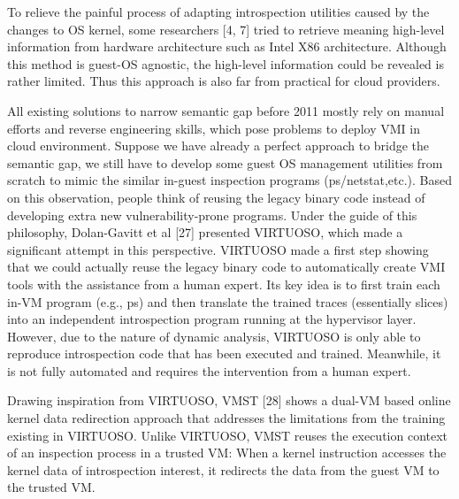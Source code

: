 To relieve the painful process of adapting introspection utilities caused by the changes to OS kernel, some researchers [4, 7] tried to retrieve meaning high-level information from hardware architecture such as Intel X86 architecture. Although this method is guest-OS agnostic, the high-level information could be revealed is rather limited. Thus this approach is also far from practical for cloud providers. 

All existing solutions to narrow semantic gap before 2011 mostly rely on manual efforts and reverse engineering skills, which pose problems to deploy VMI in cloud environment. Suppose we have already a perfect approach to bridge the semantic gap, we still have to develop some guest OS management utilities from scratch to mimic the similar in-guest inspection programs (ps/netstat,etc.). Based on this observation, people think of reusing the legacy binary code instead of developing extra new vulnerability-prone programs. Under the guide of this philosophy, Dolan-Gavitt et al [27] presented VIRTUOSO, which made a significant attempt in this perspective. VIRTUOSO made a first step showing that we could actually reuse the legacy binary code to automatically create VMI tools with the assistance from a human expert. Its key idea is to first train each in-VM program (e.g., ps) and then translate the trained traces (essentially slices) into an independent introspection program running at the hypervisor layer. However, due to the nature of dynamic analysis, VIRTUOSO is only able to reproduce introspection code that has been executed and trained. Meanwhile, it is not fully automated and requires the intervention from a human expert.

Drawing inspiration from VIRTUOSO, VMST [28] shows a dual-VM based online kernel data redirection approach that addresses the limitations from the training existing in VIRTUOSO. Unlike VIRTUOSO, VMST reuses the execution context of an inspection process in a trusted VM: When a kernel instruction accesses the kernel data of introspection interest, it redirects the data from the guest VM to the trusted VM.


